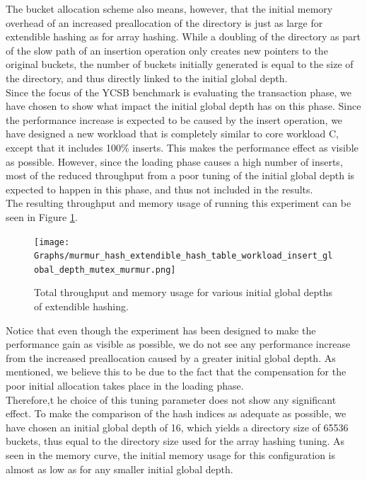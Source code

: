 \documentclass[11pt]{article} %
\begin{document}
The bucket allocation scheme also means, however, that the initial memory overhead of an increased preallocation of the directory is just as large for extendible hashing as for array hashing. While a doubling of the directory as part of the slow path of an insertion operation only creates new pointers to the original buckets, the number of buckets initially generated is equal to the size of the directory, and thus directly linked to the initial global depth. \\

Since the focus of the YCSB benchmark is evaluating the transaction phase, we have chosen to show what impact the initial global depth has on this phase. Since the performance increase is expected to be caused by the insert operation, we have designed a new workload that is completely similar to core workload C, except that it includes 100\% inserts. This makes the performance effect as visible as possible. However, since the loading phase causes a high number of inserts, most of the reduced throughput from a poor tuning of the initial global depth is expected to happen in this phase, and thus not included in the results.\\

The resulting throughput and memory usage of running this experiment can be seen in Figure \ref{fig:global_depht}.

\begin{figure}[H]
  \centering
  \texttt{[image: Graphs/murmur\_hash\_extendible\_hash\_table\_workload\_insert\_global\_depth\_mutex\_murmur.png]}\\
  \caption{Total throughput and memory usage for various initial global depths of extendible hashing.}\label{fig:global_depht}
\end{figure}

Notice that even though the experiment has been designed to make the performance gain as visible as possible, we do not see any performance increase from the increased preallocation caused by a greater initial global depth. As mentioned, we believe this to be due to the fact that the compensation for the poor initial allocation takes place in the loading phase.\\

Therefore,t he choice of this tuning parameter does not show any significant effect. To make the comparison of the hash indices as adequate as possible, we have chosen an initial global depth of 16, which yields a directory size of 65536 buckets, thus equal to the directory size used for the array hashing tuning. As seen in the memory curve, the initial memory usage for this configuration is almost as low as for any smaller initial global depth.
\end{document}
